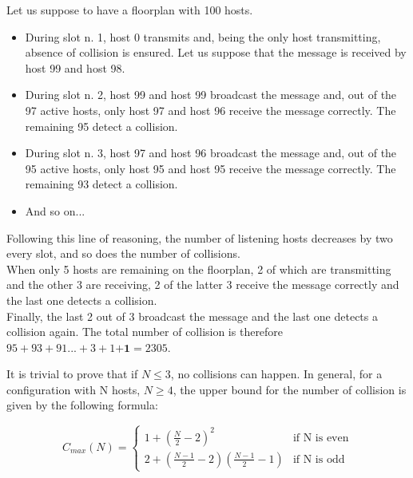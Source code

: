 \hfill \break
Let us suppose to have a floorplan with 100 hosts.\\
\begin{itemize}
	\item
	During slot n. 1, host 0 transmits and, being the only host transmitting, absence of collision is ensured. Let us suppose that the message is received by host 99 and host 98.
	\item
	During slot n. 2, host 99 and host 99 broadcast the message and, out of the 97 active hosts, only host 97 and host 96 receive the message correctly. The remaining 95 detect a collision.
	\item
	During slot n. 3, host 97 and host 96 broadcast the message and, out of the 95 active hosts, only host 95 and host 95 receive the message correctly. The remaining 93 detect a collision.
	\item
	And so on...

\end{itemize}
\hfill \break
Following this line of reasoning, the number of listening hosts decreases by two every slot, and so does the number of collisions.\\
When only 5 hosts are remaining on the floorplan, 2 of which are transmitting and the other 3 are receiving, 2 of the latter 3 receive the message correctly and the last one detects a collision.\\
Finally, the last 2 out of 3 broadcast the message and the last one detects a collision again.
\hfill \break
The total number of collision is therefore $95+93+91...+3+1\textbf{+1} = 2305$.

\hfill \break
It is trivial to prove that if $N \leq 3$, no collisions can happen.
\hfill \break
In general, for a configuration with N hosts, $N \geq 4$, the upper bound for the number of collision is given by the following formula:

\begin{equation}
\label{eq:collisionUpperBound}
	C_{max}(N) = \begin{cases}
	1+(\frac{N}{2}-2)^2 &\text{if N is even}\\
	2+(\frac{N-1}{2} - 2)(\frac{N-1}{2}-1) &\text{if N is odd}
	\end{cases}
\end{equation}
